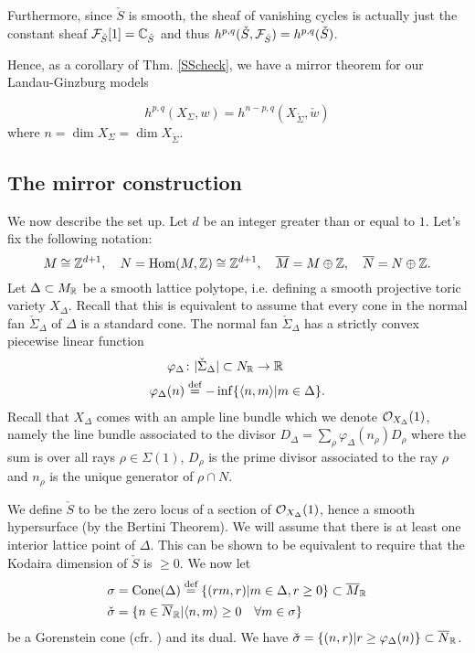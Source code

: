 \documentclass[../main.tex]{subfiles}
\begin{document}
Furthermore, since $\check{S}$ is smooth, the sheaf of vanishing cycles is actually just the constant sheaf $\mathcal{F}_{\check{S}}[1] = \mathbb{C}_{\check{S}}$ and thus $h^{p,q}(\check{S},\mathcal{F}_{\check{S}}) = h^{p,q}(\check{S})$.

Hence, as a corollary of Thm. \ref{SScheck}, we have a mirror theorem for our Landau-Ginzburg models
\begin{theorem}  \textup{\cite[Cor. 5.12]{GKR17}} \label{MirrorThmLG}
    \[
    h^{p,q} (X_\Sigma,w)= h^{n-p,q}(X_{\check{\Sigma}}, \check{w}) 
    \]
    where $n = \dim X_\Sigma = \dim X_{\check{\Sigma}}$.
\end{theorem}


\subsection{The mirror construction}

We now describe the set up. Let $d$ be an integer greater than or equal to $1$. Let's fix the following notation:
\[
M \cong \mathbb{Z}^{d+1}, \quad N= \operatorname{Hom}(M,\mathbb{Z}) \cong \mathbb{Z}^{d+1}, \quad \overline{M} = M \oplus \mathbb{Z}, \quad \overline{N} = N \oplus \mathbb{Z}.
\]
Let $\Delta \subset M_{\mathbb{R}}$ be a smooth lattice polytope, i.e. defining a smooth projective toric variety $X_\Delta$. Recall that this is equivalent to assume that every cone in the normal fan $\check{\Sigma}_\Delta$ of $\Delta$ is a standard cone. The normal fan $\check{\Sigma}_\Delta$ has a strictly convex piecewise linear function 
\begin{align*}
\varphi_\Delta &\colon | \check{\Sigma}_\Delta | \subset N_{\mathbb{R}} \to \mathbb{R} \\
 \varphi_\Delta(n) &\stackrel{\text{def}}{=}    -\inf \{\langle n,m \rangle | m \in \Delta \} .
\end{align*}
Recall that $X_\Delta$ comes with an ample line bundle which we denote $\mathcal{O}_{X_\Delta}(1)$, namely the line bundle associated to the divisor $D_\Delta = \sum_\rho \varphi_\Delta(n_\rho) D_\rho$ where the sum is over all rays $\rho \in \Sigma(1)$, $D_\rho$ is the prime divisor associated to the ray $\rho$ and $n_\rho$ is the unique generator of $\rho \cap N$. 

We define $\check{S}$ to be the zero locus of a section of $\mathcal{O}_{X_\Delta}(1)$, hence a smooth hypersurface (by the Bertini Theorem).
We will assume that there is at least one interior lattice point of $\Delta$. This can be shown \cite[Prop. 2.14]{GKR17} to be equivalent to require that the Kodaira dimension of $\check{S}$ is $\geq 0$.
We now let 
\begin{align*}
\sigma &= \operatorname{Cone}(\Delta) \stackrel{\text{def}}{=}  \{ (rm, r) | m \in \Delta, r \geq 0 \} \subset \overline{M}_{\mathbb{R}} \\
    \check{\sigma}  &= \{ n \in \overline{N}_{\mathbb{R}} | \langle n,m \rangle \geq 0 \quad \forall m \in \sigma \} 
\end{align*}
be a Gorenstein cone (cfr. \cite[Ex. 8.2.14]{CLS11}) and its dual.
We have $\check{\sigma} = \{ (n,r) | r \geq \varphi_\Delta(n) \} \subset \overline{N}_{\mathbb{R}}$.
\end{document}
